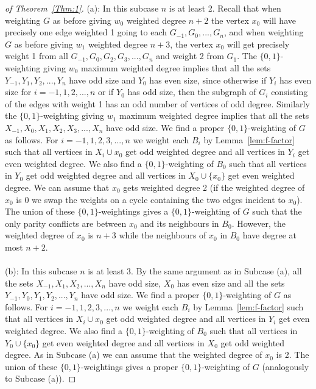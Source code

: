\documentclass[
final,
 nomarks,
]{dmtcs-episciences}
\theoremstyle{definition}
\begin{document}
\begin{proof}[of Theorem~\ref{Thm:1}]
(a): In this subcase $n$ is at least 2. Recall that when weighting $G$ as before giving $w_0$ weighted degree $n+2$ the vertex $x_0$ will have precisely one edge weighted 1 going to each $G_{-1},G_0,...,G_n$, and  when weighting $G$ as before giving $w_1$ weighted degree $n+3$, the vertex $x_0$ will get precisely weight 1 from all $G_{-1},G_0,G_2,G_3,...,G_n$ and weight 2 from $G_1$. The $\{0,1\}$-weighting giving $w_0$ maximum weighted degree implies that all the sets $Y_{-1}, Y_1, Y_2,...,Y_n$ have odd size and $Y_0$ has even size, since otherwise if $Y_i$ has even size for $i=-1,1,2,...,n$ or if $Y_0$ has odd size, then the subgraph of $G_i$ consisting of the edges with weight 1 has an odd number of vertices of odd degree. Similarly the $\{0,1\}$-weighting giving $w_1$ maximum weighted degree implies that all the sets $X_{-1},X_0,X_1,X_2,X_3,...,X_n$ have odd size. We find a proper $\{0,1\}$-weighting of $G$ as follows. For $i=-1,1,2,3,...,n$ we weight each $B_i$ by Lemma~\ref{lem:f-factor} such that all vertices in $X_i \cup {x_0}$ get odd weighted degree and all vertices in $Y_i$ get even weighted degree. We also find a $\{0,1\}$-weighting of $B_0$ such that all vertices in $Y_0$ get odd weighted degree and all vertices in $X_0 \cup \{x_0\}$ get even weighted degree. We can assume that $x_0$ gets weighted degree 2 (if the weighted degree of $x_0$ is 0 we swap the weights on a cycle containing the two edges incident to $x_0$). The union of these $\{0,1\}$-weightings gives a $\{0,1\}$-weighting of $G$ such that the only parity conflicts are between $x_0$ and its neighbours in $B_0$. However, the weighted degree of $x_0$ is $n+3$ while the neighbours of $x_0$ in $B_0$ have degree at most $n+2$.
\\ \\
(b): In this subcase $n$ is at least 3. By the same argument as in Subcase (a), all the sets $X_{-1}, X_1, X_2,...,X_n$ have odd size, $X_0$ has even size and all the sets $Y_{-1}, Y_0, Y_1, Y_2,...,Y_n$ have odd size. We find a proper $\{0,1\}$-weighting of $G$ as follows. For $i=-1,1,2,3,...,n$ we weight each $B_i$ by Lemma~\ref{lem:f-factor} such that all vertices in $X_i \cup {x_0}$ get odd weighted degree and all vertices in $Y_i$ get even weighted degree. We also find a $\{0,1\}$-weighting of $B_0$ such that all vertices in $Y_0 \cup \{x_0\}$ get even weighted degree and all vertices in $X_0$ get odd weighted degree. As in Subcase (a) we can assume that the weighted degree of $x_0$ is 2. The union of these $\{0,1\}$-weightings gives a proper $\{0,1\}$-weighting of $G$ (analogously to Subcase (a)). 

\end{proof}
\end{document}
